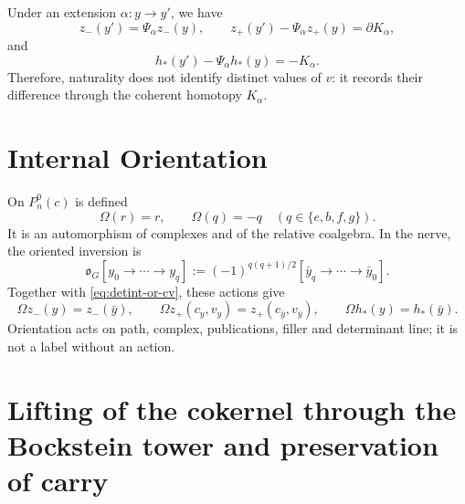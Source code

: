 Under an extension \(\alpha:y\to y'\), we have
\begin{equation}\label{eq:detint-z-natural}
 z_-(y')=\Psi_\alpha z_-(y),
 \qquad
 z_+(y')-\Psi_\alpha z_+(y)=\partial K_\alpha,
\end{equation}
and
\begin{equation}\label{eq:detint-h-natural}
 h_*(y')-\Psi_\alpha h_*(y)=-K_\alpha.
\end{equation}
Therefore, naturality does not identify distinct values of \(v\): it records
their difference through the coherent homotopy \(K_\alpha\).

\section{Internal Orientation}

On \(P_n^0(c)\) is defined
\begin{equation}\label{eq:detint-omega-p}
 \Omega(r)=r,
 \qquad
 \Omega(q)=-q\quad(q\in\{e,b,f,g\}).
\end{equation}
It is an automorphism of complexes and of the relative coalgebra. In the nerve,
the oriented inversion is
\begin{equation}\label{eq:detint-omega-g}
 \mathfrak o_G[y_0\to\cdots\to y_q]
 :=(-1)^{q(q+1)/2}
 [\bar y_q\to\cdots\to\bar y_0].
\end{equation}
Together with \eqref{eq:detint-or-cv}, these actions give
\begin{equation}\label{eq:detint-or-z-h}
 \Omega z_-(y)=z_-(\bar y),
 \qquad
 \Omega z_+(c_y,v_y)=z_+(c_{\bar y},v_{\bar y}),
 \qquad
 \Omega h_*(y)=h_*(\bar y).
\end{equation}
Orientation acts on path, complex, publications, filler and determinant
line; it is not a label without an action.

\fi
\section{Lifting of the cokernel through the Bockstein tower and preservation of carry}
\label{sec:detint-terminal}


